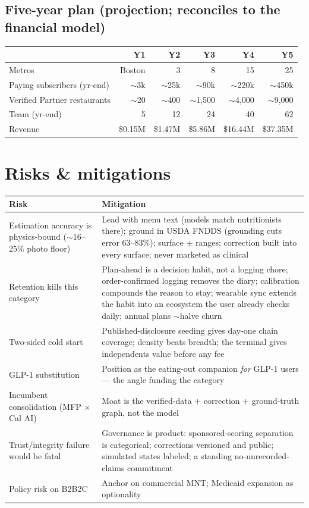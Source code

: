 \documentclass[10pt]{article}
\begin{document}
\subsection*{Five-year plan \normalfont\small\color{muted}(projection; reconciles to the financial model)}

\begin{tabularx}{\textwidth}{@{}l r r r r r@{}}
\toprule
 & \textbf{Y1} & \textbf{Y2} & \textbf{Y3} & \textbf{Y4} & \textbf{Y5}\\
\midrule
Metros & Boston & 3 & 8 & 15 & 25\\
Paying subscribers (yr-end) & $\sim$3k & $\sim$25k & $\sim$90k & $\sim$220k & $\sim$450k\\
Verified Partner restaurants & $\sim$20 & $\sim$400 & $\sim$1{,}500 & $\sim$4{,}000 & $\sim$9{,}000\\
Team (yr-end) & 5 & 12 & 24 & 40 & 62\\
Revenue & \$0.15M & \$1.47M & \$5.86M & \$16.44M & \$37.35M\\
\bottomrule
\end{tabularx}

\section{Risks \& mitigations}

\begin{tabularx}{\textwidth}{@{}>{\raggedright\arraybackslash}p{5.0cm} L@{}}
\toprule
\textbf{Risk} & \textbf{Mitigation}\\
\midrule
Estimation accuracy is physics-bound ($\sim$16--25\% photo floor) & Lead with menu text (models match nutritionists there); ground in USDA FNDDS (grounding cuts error 63--83\%); surface $\pm$ ranges; correction built into every surface; never marketed as clinical\\
Retention kills this category & Plan-ahead is a decision habit, not a logging chore; order-confirmed logging removes the diary; calibration compounds the reason to stay; wearable sync extends the habit into an ecosystem the user already checks daily; annual plans $\sim$halve churn\\
Two-sided cold start & Published-disclosure seeding gives day-one chain coverage; density beats breadth; the terminal gives independents value before any fee\\
GLP-1 substitution & Position as the eating-out companion \emph{for} GLP-1 users --- the angle funding the category\\
Incumbent consolidation (MFP $\times$ Cal AI) & Moat is the verified-data + correction + ground-truth graph, not the model\\
Trust/integrity failure would be fatal & Governance is product: sponsored-scoring separation is categorical; corrections versioned and public; simulated states labeled; a standing no-unrecorded-claims commitment\\
Policy risk on B2B2C & Anchor on commercial MNT; Medicaid expansion as optionality\\
\bottomrule
\end{tabularx}
\end{document}
